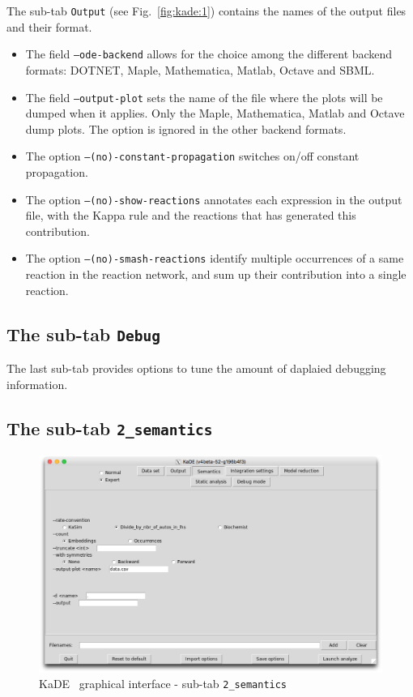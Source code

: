 \documentclass[11pt]{book}
\def\KaDE{\textsf{KaDE}}
\begin{document}
The sub-tab \texttt{Output} (see Fig.~\ref{fig:kade:1}) contains the names of the output files and their format.

\begin{itemize}
\item The field \texttt{--ode-backend} allows for the choice among the different backend formats: DOTNET, Maple, Mathematica, Matlab, Octave and SBML.
\item The field \texttt{--output-plot} sets the name of the file where the plots will be dumped when it applies. Only the Maple, Mathematica, Matlab and Octave dump plots. The option is ignored in the other backend formats.
\item The option \texttt{--(no)-constant-propagation} switches on/off constant propagation.
\item The option \texttt{--(no)-show-reactions} annotates each expression in the output file, with the Kappa rule and the reactions that has generated this contribution.
\item The option \texttt{--(no)-smash-reactions} identify multiple occurrences of a same reaction in the reaction network, and sum up  their contribution into a single reaction.
\end{itemize}



\subsection{The sub-tab \texttt{Debug}}

The last sub-tab provides options to tune the amount of daplaied debugging information.

\subsection{The sub-tab \texttt{2\_semantics}}

\begin{figure}[htbp]
\centering
\includegraphics[width=12cm,bb=0 0 1904 1208]{img/kade_2.png}
\caption{\KaDE~ graphical interface - sub-tab \texttt{2\_semantics}}
\label{fig:kade:2}
\end{figure}
\end{document}
